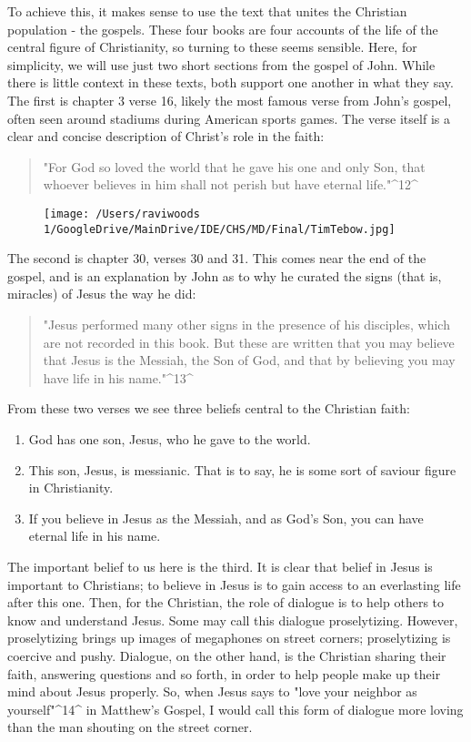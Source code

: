 \documentclass[]{article}
\begin{document}
To achieve this, it makes sense to use the text that unites the
Christian population - the gospels. These four books are four accounts
of the life of the central figure of Christianity, so turning to these
seems sensible. Here, for simplicity, we will use just two short
sections from the gospel of John. While there is little context in these
texts, both support one another in what they say. The first is chapter 3
verse 16, likely the most famous verse from John's gospel, often seen
around stadiums during American sports games. The verse itself is a
clear and concise description of Christ's role in the faith:

\begin{quote}
"For God so loved the world that he gave his one and only Son, that
whoever believes in him shall not perish but have eternal
life."\^{}12\^{}
\end{quote}

\begin{figure}
\centering
\texttt{[image: /Users/raviwoods 1/GoogleDrive/MainDrive/IDE/CHS/MD/Final/TimTebow.jpg]}
\caption{}
\end{figure}

The second is chapter 30, verses 30 and 31. This comes near the end of
the gospel, and is an explanation by John as to why he curated the signs
(that is, miracles) of Jesus the way he did:

\begin{quote}
"Jesus performed many other signs in the presence of his disciples,
which are not recorded in this book. But these are written that you may
believe that Jesus is the Messiah, the Son of God, and that by believing
you may have life in his name."\^{}13\^{}
\end{quote}

From these two verses we see three beliefs central to the Christian
faith:

\begin{enumerate}
\def\labelenumi{\arabic{enumi}.}
\item
  God has one son, Jesus, who he gave to the world. 
\item
  This son, Jesus, is messianic. That is to say, he is some sort of
  saviour figure in Christianity. 
\item
  If you believe in Jesus as the Messiah, and as God's Son, you can have
  eternal life in his name.
\end{enumerate}

The important belief to us here is the third. It is clear that belief in
Jesus is important to Christians; to believe in Jesus is to gain access
to an everlasting life after this one. Then, for the Christian, the role
of dialogue is to help others to know and understand Jesus. Some may
call this dialogue proselytizing. However, proselytizing brings up
images of megaphones on street corners; proselytizing is coercive and
pushy. Dialogue, on the other hand, is the Christian sharing their
faith, answering questions and so forth, in order to help people make up
their mind about Jesus properly. So, when Jesus says to "love your
neighbor as yourself"\^{}14\^{} in Matthew's Gospel, I would call this
form of dialogue more loving than the man shouting on the street corner.
\end{document}
